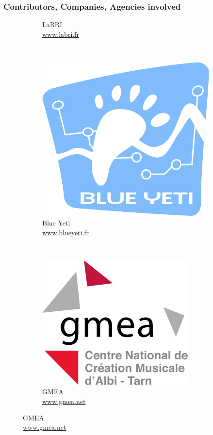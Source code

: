 \documentclass{beamer}
\begin{document}
\begin{frame}
    \frametitle{Contributors, Companies, Agencies involved}
    \begin{figure}[htbp]
    \begin{subfigure}[b]{0.25\textwidth} 
        \centering
        
        \caption{LaBRI \\ \url{www.labri.fr}}
    \end{subfigure}
    ~
    \begin{subfigure}[b]{0.25\textwidth} 
        \centering
        \includegraphics[scale=0.12]{images/by.png}
        \caption[]{Blue Yeti\\ \url{www.blueyeti.fr}}
    \end{subfigure}
    ~
    \begin{subfigure}[b]{0.25\textwidth} 
        \centering
        \includegraphics[scale=0.15]{images/gmea.png}
        \caption[]{GMEA\\\url{www.gmea.net}}
    \end{subfigure}
    

\end{figure}
\end{frame}
\end{document}
